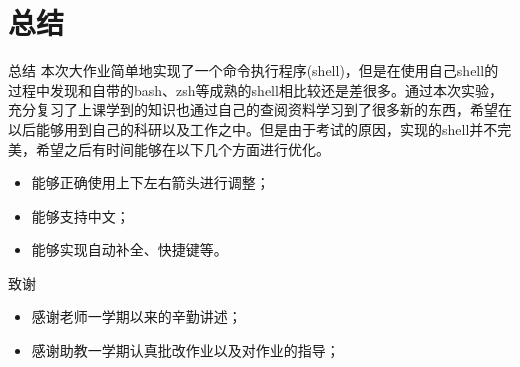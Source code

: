 \documentclass[10pt]{beamer}
\begin{document}
\section{总结}
\begin{frame}{总结}
本次大作业简单地实现了一个命令执行程序(shell)，但是在使用自己shell的过程中发现和自带的bash、zsh等成熟的shell相比较还是差很多。通过本次实验，充分复习了上课学到的知识也通过自己的查阅资料学习到了很多新的东西，希望在以后能够用到自己的科研以及工作之中。但是由于考试的原因，实现的shell并不完美，希望之后有时间能够在以下几个方面进行优化。

\begin{itemize}
	\item 能够正确使用上下左右箭头进行调整；
	\item 能够支持中文；
	\item 能够实现自动补全、快捷键等。
\end{itemize}
\end{frame}

\begin{frame}{致谢}
\begin{itemize}
	\item 感谢老师一学期以来的辛勤讲述；
	\item 感谢助教一学期认真批改作业以及对作业的指导；
\end{itemize}
\end{frame}
\end{document}
